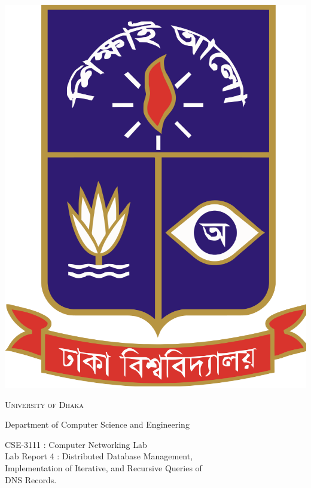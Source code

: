 \documentclass[11pt]{article}
\begin{document}
\begin{titlepage}
    \begin{center}
        \includegraphics[scale=0.10]{du.png}\par
        \begin{Huge}
            \textsc{University of Dhaka}\par
        \end{Huge}
        \begin{Large}
            Department of Computer Science and Engineering\par \vspace{1cm}
            CSE-3111 : Computer Networking Lab \\[12pt]   
            Lab Report 4 : Distributed Database Management,\\[8pt]Implementation of Iterative, and Recursive
Queries of \\[8pt]DNS Records.
        \end{Large}
    \end{center}     
    \begin{large}

\end{large}
\end{titlepage}
\end{document}
